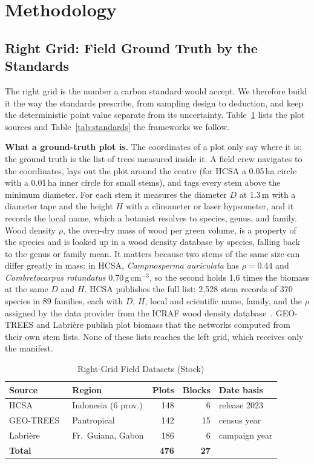 \documentclass[conference,a4paper]{IEEEtran}
\begin{document}
\section{Methodology}

\subsection{Right Grid: Field Ground Truth by the Standards}
The right grid is the number a carbon standard would accept. We therefore build it the way the standards prescribe, from sampling design to deduction, and keep the deterministic point value separate from its uncertainty. Table~\ref{tab:data} lists the plot sources and Table~\ref{tab:standards} the frameworks we follow.

\textbf{What a ground-truth plot is.} The coordinates of a plot only say where it is; the ground truth is the list of trees measured inside it. A field crew navigates to the coordinates, lays out the plot around the centre (for HCSA a 0.05\,ha circle with a 0.01\,ha inner circle for small stems), and tags every stem above the minimum diameter. For each stem it measures the diameter $D$ at 1.3\,m with a diameter tape and the height $H$ with a clinometer or laser hypsometer, and it records the local name, which a botanist resolves to species, genus, and family. Wood density $\rho$, the oven-dry mass of wood per green volume, is a property of the species and is looked up in a wood density database by species, falling back to the genus or family mean. It matters because two stems of the same size can differ greatly in mass: in HCSA, \textit{Campnosperma auriculata} has $\rho=0.44$ and \textit{Combretocarpus rotundatus} 0.70\,g\,cm$^{-3}$, so the second holds 1.6 times the biomass at the same $D$ and $H$. HCSA publishes the full list: 2{,}528 stem records of 370 species in 89 families, each with $D$, $H$, local and scientific name, family, and the $\rho$ assigned by the data provider from the ICRAF wood density database~\cite{hcsa2023data}. GEO-TREES and Labri\`ere publish plot biomass that the networks computed from their own stem lists. None of these lists reaches the left grid, which receives only the manifest.

\begin{table}[t]
\centering
\caption{Right-Grid Field Datasets (Stock)}
\label{tab:data}
\footnotesize
\renewcommand{\arraystretch}{1.1}
\setlength{\tabcolsep}{3.5pt}
\begin{tabular}{@{}l l r r l@{}}
\toprule
\textbf{Source} & \textbf{Region} & \textbf{Plots} & \textbf{Blocks} & \textbf{Date basis}\\
\midrule
HCSA~\cite{hcsa2023data} & Indonesia (6 prov.) & 148 & 6 & release 2023\\
GEO-TREES~\cite{geotrees2024} & Pantropical & 142 & 15 & census year\\
Labri\`ere~\cite{labriere2018insitu} & Fr.\ Guiana, Gabon & 186 & 6 & campaign year\\
\midrule
\textbf{Total} & & \textbf{476} & \textbf{27} & \\
\bottomrule
\end{tabular}
\end{table}
\end{document}
